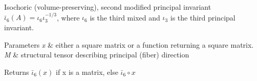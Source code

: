 \-Isochoric (volume-\/preserving), second modified principal invariant $ \bar\iota_6(A)=\iota_6\iota_3^{-1/3} $, where $\iota_6$ is the third mixed and $\iota_3$ is the third principal invariant. 


\begin{DoxyParams}{\-Parameters}
{\em x} & either a square matrix or a function returning a square matrix. \\
\hline
{\em \-M} & structural tensor describing principal (fiber) direction \\
\hline
\end{DoxyParams}
\begin{DoxyReturn}{\-Returns}
$\bar\iota_6(x)$ if x is a matrix, else $\bar\iota_6 \circ x$ 
\end{DoxyReturn}
